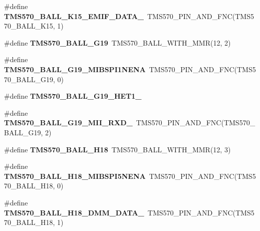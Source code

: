 \begin{DoxyCompactItemize}
\mbox{\label{tms570ls3137zwt-pins_8h_a671c9b81d8d1d4a1a7b585b0b9ff8877}} 
\#define {\bfseries T\+M\+S570\+\_\+\+B\+A\+L\+L\+\_\+\+K15\+\_\+\+E\+M\+I\+F\+\_\+\+D\+A\+T\+A\+\_}~T\+M\+S570\+\_\+\+P\+I\+N\+\_\+\+A\+N\+D\+\_\+\+F\+NC(T\+M\+S570\+\_\+\+B\+A\+L\+L\+\_\+\+K15, 1)
\item 
\mbox{\label{tms570ls3137zwt-pins_8h_a8efe435b2e99c7ac6be20d020f04745c}} 
\#define {\bfseries T\+M\+S570\+\_\+\+B\+A\+L\+L\+\_\+\+G19}~T\+M\+S570\+\_\+\+B\+A\+L\+L\+\_\+\+W\+I\+T\+H\+\_\+\+M\+MR(12, 2)
\item 
\mbox{\label{tms570ls3137zwt-pins_8h_a652b254334340b2a5775ec5a6aa90f19}} 
\#define {\bfseries T\+M\+S570\+\_\+\+B\+A\+L\+L\+\_\+\+G19\+\_\+\+M\+I\+B\+S\+P\+I1\+N\+E\+NA}~T\+M\+S570\+\_\+\+P\+I\+N\+\_\+\+A\+N\+D\+\_\+\+F\+NC(T\+M\+S570\+\_\+\+B\+A\+L\+L\+\_\+\+G19, 0)
\item 
\#define {\bfseries T\+M\+S570\+\_\+\+B\+A\+L\+L\+\_\+\+G19\+\_\+\+H\+E\+T1\+\_}
\item 
\mbox{\label{tms570ls3137zwt-pins_8h_afb05aed650c324fcf5618224fa1b682f}} 
\#define {\bfseries T\+M\+S570\+\_\+\+B\+A\+L\+L\+\_\+\+G19\+\_\+\+M\+I\+I\+\_\+\+R\+X\+D\+\_}~T\+M\+S570\+\_\+\+P\+I\+N\+\_\+\+A\+N\+D\+\_\+\+F\+NC(T\+M\+S570\+\_\+\+B\+A\+L\+L\+\_\+\+G19, 2)
\item 
\mbox{\label{tms570ls3137zwt-pins_8h_afca49763384a7130455119b9ddf5d314}} 
\#define {\bfseries T\+M\+S570\+\_\+\+B\+A\+L\+L\+\_\+\+H18}~T\+M\+S570\+\_\+\+B\+A\+L\+L\+\_\+\+W\+I\+T\+H\+\_\+\+M\+MR(12, 3)
\item 
\mbox{\label{tms570ls3137zwt-pins_8h_a6817aca8e6fdd397f560de1c96c9ebce}} 
\#define {\bfseries T\+M\+S570\+\_\+\+B\+A\+L\+L\+\_\+\+H18\+\_\+\+M\+I\+B\+S\+P\+I5\+N\+E\+NA}~T\+M\+S570\+\_\+\+P\+I\+N\+\_\+\+A\+N\+D\+\_\+\+F\+NC(T\+M\+S570\+\_\+\+B\+A\+L\+L\+\_\+\+H18, 0)
\item 
\mbox{\label{tms570ls3137zwt-pins_8h_a27365974584dfe175877b21f59360c14}} 
\#define {\bfseries T\+M\+S570\+\_\+\+B\+A\+L\+L\+\_\+\+H18\+\_\+\+D\+M\+M\+\_\+\+D\+A\+T\+A\+\_}~T\+M\+S570\+\_\+\+P\+I\+N\+\_\+\+A\+N\+D\+\_\+\+F\+NC(T\+M\+S570\+\_\+\+B\+A\+L\+L\+\_\+\+H18, 1)

\end{DoxyCompactItemize}
